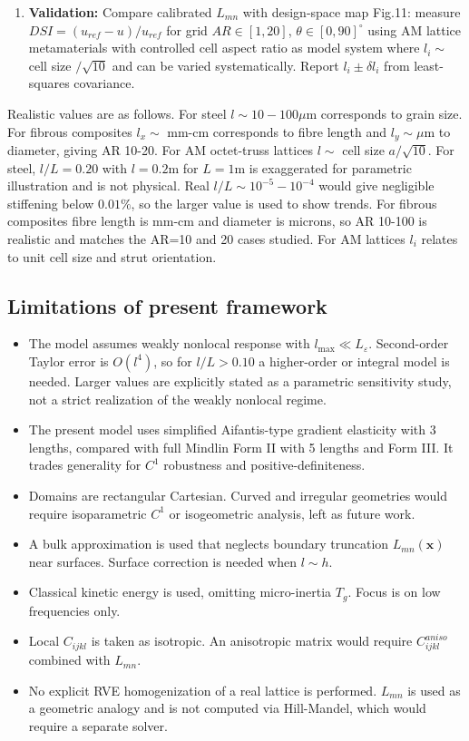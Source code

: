 \documentclass[final,3p,times,fleqn]{elsarticle}
\newcommand{\rev}[1]{\textcolor{revcolor}{#1}}
\begin{document}
\begin{enumerate}
    \item \rev{\textbf{Validation:} Compare calibrated $L_{mn}$ with design-space map Fig.11: measure $DSI=(u_{ref}-u)/u_{ref}$ for grid $AR\in[1,20]$, $\theta\in[0,90]^\circ$ using AM lattice metamaterials with controlled cell aspect ratio as model system where $l_i\sim$ cell size $/\sqrt{10}$ and can be varied systematically. Report $l_i\pm \delta l_i$ from least-squares covariance.}
\end{enumerate}

\rev{Realistic values are as follows. For steel $l\sim10-100\mu$m corresponds to grain size. For fibrous composites $l_x\sim$ mm-cm corresponds to fibre length and $l_y\sim\mu$m to diameter, giving AR 10-20. For AM octet-truss lattices $l\sim$ cell size $a/\sqrt{10}$. For steel, $l/L=0.20$ with $l=0.2$m for $L=1$m is exaggerated for parametric illustration and is not physical. Real $l/L\sim10^{-5}-10^{-4}$ would give negligible stiffening below $0.01\%$, so the larger value is used to show trends. For fibrous composites fibre length is mm-cm and diameter is microns, so AR 10-100 is realistic and matches the AR=10 and 20 cases studied. For AM lattices $l_i$ relates to unit cell size and strut orientation.}

\subsection{Limitations of present framework}
\begin{itemize}
    \item \rev{The model assumes weakly nonlocal response with $l_{\max}\ll L_\varepsilon$. Second-order Taylor error is $O(l^4)$, so for $l/L>0.10$ a higher-order or integral model is needed. Larger values are explicitly stated as a parametric sensitivity study, not a strict realization of the weakly nonlocal regime.}
    \item \rev{The present model uses simplified Aifantis-type gradient elasticity with 3 lengths, compared with full Mindlin Form II with 5 lengths and Form III. It trades generality for $C^1$ robustness and positive-definiteness.}
    \item \rev{Domains are rectangular Cartesian. Curved and irregular geometries would require isoparametric $C^1$ or isogeometric analysis, left as future work.}
    \item \rev{A bulk approximation is used that neglects boundary truncation $L_{mn}(\mathbf{x})$ near surfaces. Surface correction is needed when $l\sim h$.}
    \item \rev{Classical kinetic energy is used, omitting micro-inertia $T_g$. Focus is on low frequencies only.}
    \item \rev{Local $C_{ijkl}$ is taken as isotropic. An anisotropic matrix would require $C^{aniso}_{ijkl}$ combined with $L_{mn}$.}
    \item \rev{No explicit RVE homogenization of a real lattice is performed. $L_{mn}$ is used as a geometric analogy and is not computed via Hill-Mandel, which would require a separate solver.}
\end{itemize}
\end{document}
